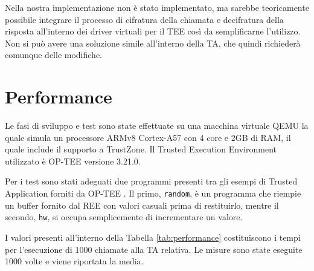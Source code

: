 \documentclass[12pt,italian]{report}
\begin{document}
	\bigbreak
	
	Nella nostra implementazione non è stato implementato, ma sarebbe teoricamente possibile integrare il processo di cifratura della chiamata e decifratura della risposta all'interno dei driver virtuali per il TEE così da semplificarne l'utilizzo. Non si può avere una soluzione simile all'interno della TA, che quindi richiederà comunque delle modifiche.
	
	\newpage
	
	\section{Performance}
	\label{sec:dati}
	Le fasi di sviluppo e test sono state effettuate su una macchina virtuale QEMU la quale simula un processore ARMv8 Cortex-A57 con 4 core e 2GB di RAM, il quale include il supporto a TrustZone. Il Trusted Execution Environment utilizzato è OP-TEE versione 3.21.0.
	
	Per i test sono stati adeguati due programmi presenti tra gli esempi di Trusted Application forniti da OP-TEE \cite{optee_examples}. Il primo, \texttt{random}, è un programma che riempie un buffer fornito dal REE con valori casuali prima di restituirlo, mentre il secondo, \texttt{hw}, si occupa semplicemente di incrementare un valore.
	
	I valori presenti all'interno della Tabella \ref{tab:performance} costituiscono i tempi per l'esecuzione di 1000 chiamate alla TA relativa. Le misure sono state eseguite 1000 volte e viene riportata la media.  
	
\end{document}
